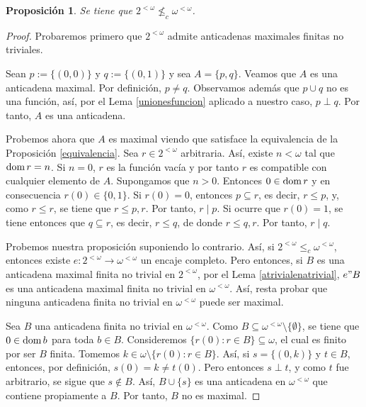 \documentclass[11pt]{unam_tesis1}
\theoremstyle{MyThmStyle}
\theoremstyle{definition}
\theoremstyle{plain}
\newtheorem{proposition}[definition]{Proposici\'on}
\theoremstyle{remark}
\def\dom{\mathop{\rm dom}\nolimits}
\let\leq\leqslant
\begin{document}
\begin{proposition}
Se tiene que $2^{<\omega}\nleq_c \omega^{<\omega}$.
\end{proposition}

\begin{proof}
Probaremos primero que $2^{<\omega}$ admite anticadenas maximales finitas no triviales.

Sean $p:=\{(0,0)\}$ y $q:=\{(0,1) \}$ y sea $A=\{p,q\}$. Veamos que $A$ es una anticadena maximal. Por definici\'on, $p\neq q$. Observamos adem\'as que $p\cup q$ no es una funci\'on, as\'i, por el Lema \ref{unionesfuncion} aplicado a nuestro caso, $p\perp q$. Por tanto, $A$ es una anticadena. 

Probemos ahora que $A$ es maximal viendo que satisface la equivalencia de la Proposici\'on \ref{equivalencia}. Sea $r\in 2^{<\omega}$ arbitraria. As\'i, existe $n<\omega$ tal que $\dom r=n$. Si $n=0$, $r$ es la funci\'on vac\'ia y por tanto $r$ es compatible con cualquier elemento de $A$. Supongamos que $n>0$. Entonces $0\in \dom r$ y en consecuencia $r(0)\in \{0,1\}$. Si $r(0)=0$, entonces $p\subseteq r$, es decir, $r\leq p$, y, como $r\leq r$, se tiene que $r\leq p,r$. Por tanto, $r\mid p$. Si ocurre que $r(0)=1$, se tiene entonces que $q\subseteq r$, es decir, $r\leq q$, de donde $r\leq q,r$. Por tanto, $r\mid q$.

Probemos nuestra proposici\'on suponiendo lo contrario. As\'i, si $2^{<\omega}\leq_c \omega^{<\omega}$, entonces existe $e: 2^{<\omega} \rightarrow \omega^{<\omega}$ un encaje completo. Pero entonces, si $B$ es una anticadena maximal finita no trivial en $2^{<\omega}$, por el Lema \ref{atrivialenatrivial}, $e"B$ es una anticadena maximal finita no trivial en $\omega^{<\omega}$. As\'i, resta probar que ninguna anticadena finita no trivial en $\omega^{<\omega}$ puede ser maximal.

Sea $B$ una anticadena finita no trivial en $\omega^{<\omega}$. Como $B \subseteq \omega^{<\omega}\setminus \{ \emptyset \}$, se tiene que $0\in \dom b$ para toda $b\in B$. Consideremos $\{r(0):r\in B \}\subseteq \omega$, el cual es finito por ser $B$ finita. Tomemos $k\in \omega \setminus \{r(0):r\in B \}$. As\'i, si $s=\{(0,k)\}$ y $t\in B$, entonces, por definici\'on, $s(0) = k \neq t(0)$. Pero entonces $s\perp t$, y como $t$ fue arbitrario, se sigue que $s\notin B$. As\'i, $B\cup \{s\}$ es una anticadena en $\omega^{<\omega}$ que contiene propiamente a $B$. Por tanto, $B$ no es maximal.
\end{proof}
\end{document}
